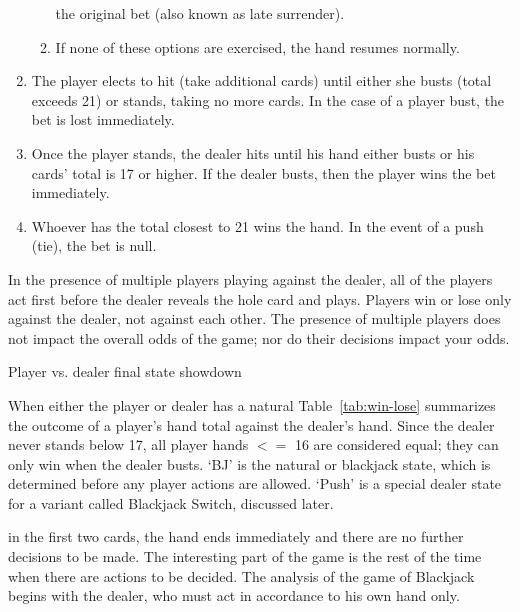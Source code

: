 \begin{enumerate}
\begin{enumerate}
the original bet (also known as late surrender).
\item If none of these options are exercised, the hand resumes normally.
\end{enumerate}
\item The player elects to hit (take additional cards) until either
she busts (total exceeds 21) or stands, taking no more cards.
In the case of a player bust, the bet is lost immediately.
\item Once the player stands, the dealer hits until his hand either busts
or his cards' total is 17 or higher.  
If the dealer busts, then the player wins the bet immediately.  
\item Whoever has the total closest to 21 wins the hand.
In the event of a push (tie), the bet is null.
\end{enumerate}


In the presence of multiple players playing against the dealer, 
all of the players act first before the dealer reveals the hole card
and plays.  
Players win or lose only against the dealer, not against each other.
The presence of multiple players does not impact the overall 
odds of the game; nor do their decisions impact your odds.

\begin{table}[ht!]
\caption{Player vs. dealer final state showdown}
\begin{center}

\end{center}
\label{tab:win-lose}
\end{table}

When either the player or dealer has a natural
Table~\ref{tab:win-lose} summarizes the outcome of a player's hand total
against the dealer's hand.
Since the dealer never stands below 17, all player hands $<=$ 16
are considered equal; they can only win when the dealer busts.
`BJ' is the natural or blackjack state, which is determined 
before any player actions are allowed.
`Push' is a special dealer state for a variant called Blackjack Switch, 
discussed later.

in the first two cards, the hand ends immediately
and there are no further decisions to be made.
The interesting part of the game is the rest of the time when
there are actions to be decided.
The analysis of the game of Blackjack begins with
the dealer, who must act in accordance to his own hand only.

